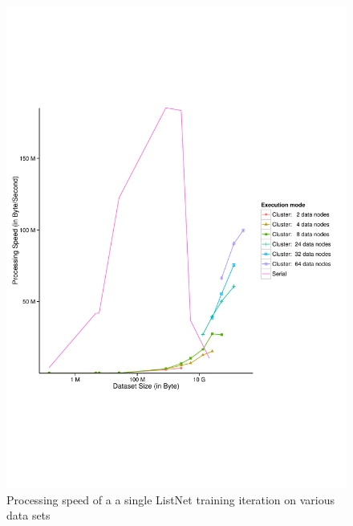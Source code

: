 \begin{figure}
\centering
\includegraphics[trim=0cm 5cm 0cm 5cm, scale=0.8]{gfx/processing_speed_single_logx.pdf}
\caption{Processing speed of a a single ListNet training iteration on various data sets}
\label{fig:listnet_processing_speed}
\end{figure}
